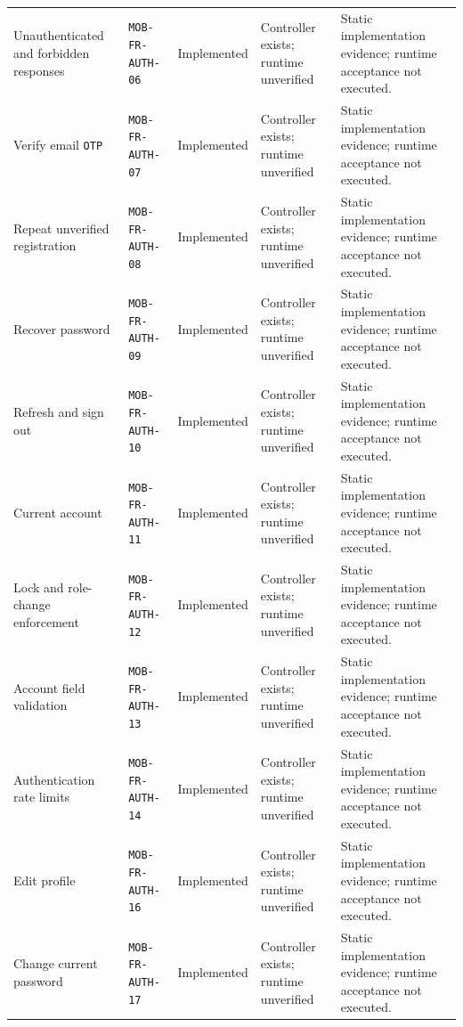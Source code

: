 \begin{longtable}{@{}P{0.19000\SRSWidth}P{0.18000\SRSWidth}P{0.15000\SRSWidth}P{0.20000\SRSWidth}P{0.28000\SRSWidth}@{}}
Unauthenticated and forbidden responses & \texttt{MOB-\allowbreak{}FR-\allowbreak{}AUTH-\allowbreak{}06} & Implemented & Controller exists; runtime unverified & Static implementation evidence; runtime acceptance not executed. \\[3pt]
Verify email \texttt{OTP} & \texttt{MOB-\allowbreak{}FR-\allowbreak{}AUTH-\allowbreak{}07} & Implemented & Controller exists; runtime unverified & Static implementation evidence; runtime acceptance not executed. \\[3pt]
Repeat unverified registration & \texttt{MOB-\allowbreak{}FR-\allowbreak{}AUTH-\allowbreak{}08} & Implemented & Controller exists; runtime unverified & Static implementation evidence; runtime acceptance not executed. \\[3pt]
Recover password & \texttt{MOB-\allowbreak{}FR-\allowbreak{}AUTH-\allowbreak{}09} & Implemented & Controller exists; runtime unverified & Static implementation evidence; runtime acceptance not executed. \\[3pt]
Refresh and sign out & \texttt{MOB-\allowbreak{}FR-\allowbreak{}AUTH-\allowbreak{}10} & Implemented & Controller exists; runtime unverified & Static implementation evidence; runtime acceptance not executed. \\[3pt]
Current account & \texttt{MOB-\allowbreak{}FR-\allowbreak{}AUTH-\allowbreak{}11} & Implemented & Controller exists; runtime unverified & Static implementation evidence; runtime acceptance not executed. \\[3pt]
Lock and role-change enforcement & \texttt{MOB-\allowbreak{}FR-\allowbreak{}AUTH-\allowbreak{}12} & Implemented & Controller exists; runtime unverified & Static implementation evidence; runtime acceptance not executed. \\[3pt]
Account field validation & \texttt{MOB-\allowbreak{}FR-\allowbreak{}AUTH-\allowbreak{}13} & Implemented & Controller exists; runtime unverified & Static implementation evidence; runtime acceptance not executed. \\[3pt]
Authentication rate limits & \texttt{MOB-\allowbreak{}FR-\allowbreak{}AUTH-\allowbreak{}14} & Implemented & Controller exists; runtime unverified & Static implementation evidence; runtime acceptance not executed. \\[3pt]
Edit profile & \texttt{MOB-\allowbreak{}FR-\allowbreak{}AUTH-\allowbreak{}16} & Implemented & Controller exists; runtime unverified & Static implementation evidence; runtime acceptance not executed. \\[3pt]
Change current password & \texttt{MOB-\allowbreak{}FR-\allowbreak{}AUTH-\allowbreak{}17} & Implemented & Controller exists; runtime unverified & Static implementation evidence; runtime acceptance not executed. \\[3pt]

\end{longtable}
